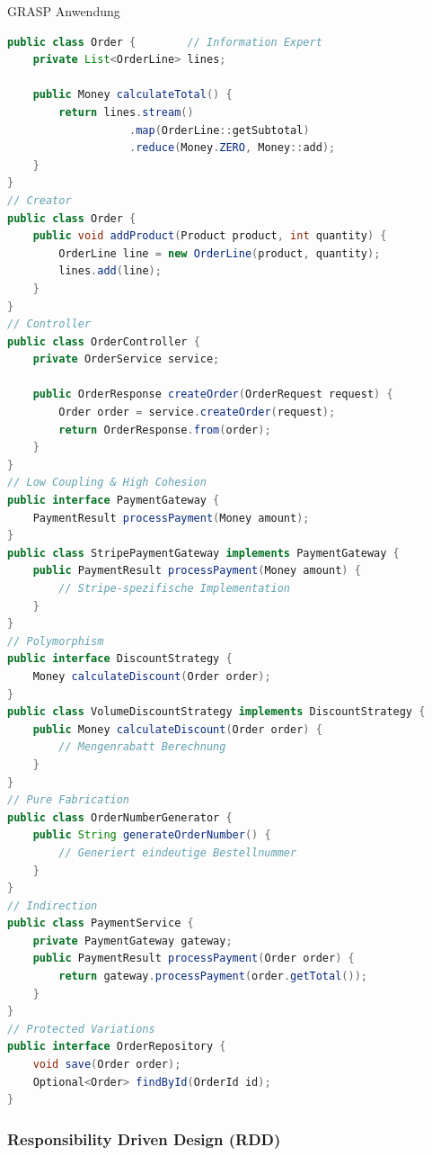 \begin{example2}{GRASP Anwendung}
\begin{lstlisting}[language=Java, style=basesmol]
public class Order {        // Information Expert
    private List<OrderLine> lines;
    
    public Money calculateTotal() {
        return lines.stream()
                   .map(OrderLine::getSubtotal)
                   .reduce(Money.ZERO, Money::add);
    }
}
// Creator
public class Order {
    public void addProduct(Product product, int quantity) {
        OrderLine line = new OrderLine(product, quantity);
        lines.add(line);
    }
}
// Controller
public class OrderController {
    private OrderService service;
    
    public OrderResponse createOrder(OrderRequest request) {
        Order order = service.createOrder(request);
        return OrderResponse.from(order);
    }
}
// Low Coupling & High Cohesion
public interface PaymentGateway {
    PaymentResult processPayment(Money amount);
}
public class StripePaymentGateway implements PaymentGateway {
    public PaymentResult processPayment(Money amount) {
        // Stripe-spezifische Implementation
    }
}
// Polymorphism
public interface DiscountStrategy {
    Money calculateDiscount(Order order);
}
public class VolumeDiscountStrategy implements DiscountStrategy {
    public Money calculateDiscount(Order order) {
        // Mengenrabatt Berechnung
    }
}
// Pure Fabrication
public class OrderNumberGenerator {
    public String generateOrderNumber() {
        // Generiert eindeutige Bestellnummer
    }
}
// Indirection
public class PaymentService {
    private PaymentGateway gateway;
    public PaymentResult processPayment(Order order) {
        return gateway.processPayment(order.getTotal());
    }
}
// Protected Variations
public interface OrderRepository {
    void save(Order order);
    Optional<Order> findById(OrderId id);
}
\end{lstlisting}
\end{example2}

\subsubsection{Responsibility Driven Design (RDD)}

